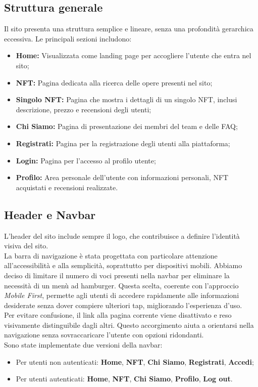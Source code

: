 \documentclass[10pt]{article}
\begin{document}
\subsection{Struttura generale}
Il sito presenta una struttura semplice e lineare, senza una profondità gerarchica eccessiva. Le principali sezioni includono:
\begin{itemize}
\item \textbf{Home:} Visualizzata come landing page per accogliere l'utente che entra nel sito;
\item \textbf{NFT:} Pagina dedicata alla ricerca delle opere presenti nel sito;
\item \textbf{Singolo NFT:} Pagina che mostra i dettagli di un singolo NFT, inclusi descrizione, prezzo e recensioni degli utenti;
\item \textbf{Chi Siamo:} Pagina di presentazione dei membri del team e delle FAQ;
\item \textbf{Registrati:} Pagina per la registrazione degli utenti alla piattaforma;
\item \textbf{Login:} Pagina per l'accesso al profilo utente;
\item \textbf{Profilo:} Area personale dell'utente con informazioni personali, NFT acquistati e recensioni realizzate.
\end{itemize}

\subsection{Header e Navbar}
L'header del sito include sempre il logo, che contribuisce a definire l’identità visiva del sito.\\
La barra di navigazione è stata progettata con particolare attenzione all'accessibilità e alla semplicità, soprattutto per dispositivi mobili. Abbiamo deciso di limitare il numero di voci presenti nella navbar per eliminare la necessità di un menù ad hamburger. Questa scelta, coerente con l'approccio \textit{Mobile First}, permette agli utenti di accedere rapidamente alle informazioni desiderate senza dover compiere ulteriori tap, migliorando l’esperienza d’uso.\\
Per evitare confusione, il link alla pagina corrente viene disattivato e reso visivamente distinguibile dagli altri. Questo accorgimento aiuta a orientarsi nella navigazione senza sovraccaricare l'utente con opzioni ridondanti.\\

Sono state implementate due versioni della navbar:
\begin{itemize}
\item Per utenti non autenticati: \textbf{Home}, \textbf{NFT}, \textbf{Chi Siamo}, \textbf{Registrati}, \textbf{Accedi};
\item Per utenti autenticati: \textbf{Home}, \textbf{NFT}, \textbf{Chi Siamo}, \textbf{Profilo}, \textbf{Log out}.
\end{itemize}
\end{document}
